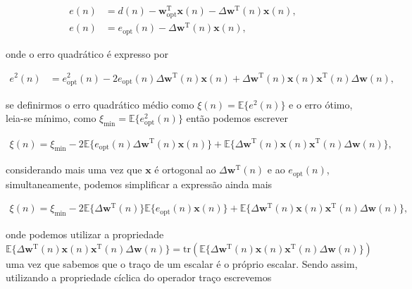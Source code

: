 \begin{enumerate}
        \begin{align}
            e(n) &= d(n) - \mathbf{w}^{\text{T}}_{\text{opt}} \mathbf{x}(n) - \Delta \mathbf{w}^{\text{T}}(n) \mathbf{x}(n), \\
            e(n) &= e_{\text{opt}}(n) - \Delta \mathbf{w}^{\text{T}}(n) \mathbf{x}(n),
        \end{align}

        onde o erro quadrático é expresso por

        \begin{align}
            e^{2}(n) &= e^{2}_{\text{opt}}(n) - 2 e_{\text{opt}}(n) \Delta \mathbf{w}^{\text{T}}(n) \mathbf{x}(n) + \Delta \mathbf{w}^{\text{T}}(n) \mathbf{x}(n) \mathbf{x}^{\text{T}}(n) \Delta \mathbf{w}(n) ,
        \end{align}

        se definirmos o erro quadrático médio como $\xi(n) = \mathbb{E}\{e^{2}(n)\}$ e o erro ótimo, leia-se mínimo, como $\xi_{\text{min}} = \mathbb{E}\{e^{2}_{\text{opt}}(n)\}$
        então podemos escrever
        
        \begin{align}
            \xi(n) = \xi_{\text{min}} - 2 \mathbb{E}\{e_{\text{opt}}(n) \Delta \mathbf{w}^{\text{T}}(n) \mathbf{x}(n)\} + \mathbb{E}\{\Delta \mathbf{w}^{\text{T}}(n) \mathbf{x}(n) \mathbf{x}^{\text{T}}(n) \Delta \mathbf{w}(n)\},
        \end{align}

        considerando mais uma vez que $\mathbf{x}$ é ortogonal ao $\Delta \mathbf{w}^{\text{T}}(n)$ e ao $e_{\text{opt}}(n)$, simultaneamente, podemos simplificar a expressão ainda mais 

        \begin{align}
            \xi(n) = \xi_{\text{min}} - 2 \mathbb{E}\{\Delta \mathbf{w}^{\text{T}}(n)\} \mathbb{E}\{e_{\text{opt}}(n) \mathbf{x}(n)\} + \mathbb{E}\{\Delta \mathbf{w}^{\text{T}}(n) \mathbf{x}(n) \mathbf{x}^{\text{T}}(n) \Delta \mathbf{w}(n)\},
        \end{align}

        onde podemos utilizar a propriedade $\mathbb{E}\{\Delta \mathbf{w}^{\text{T}}(n) \mathbf{x}(n) \mathbf{x}^{\text{T}}(n) \Delta \mathbf{w}(n)\} = \text{tr}(\mathbb{E}\{\Delta \mathbf{w}^{\text{T}}(n) \mathbf{x}(n) \mathbf{x}^{\text{T}}(n) \Delta \mathbf{w}(n)\})$ uma vez
        que sabemos que o traço de um escalar é o próprio escalar. Sendo assim, utilizando a propriedade cíclica do operador traço escrevemos


\end{enumerate}
